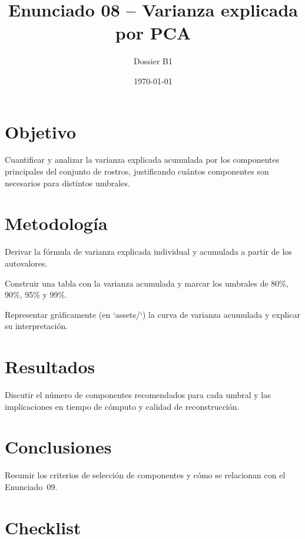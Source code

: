 \documentclass[12pt]{article}
\title{Enunciado 08 -- Varianza explicada por PCA}
\author{Dossier B1}
\date{\today}
\begin{document}
\maketitle
\section{Objetivo}
Cuantificar y analizar la varianza explicada acumulada por los componentes principales del conjunto de rostros, justificando cuántos componentes son necesarios para distintos umbrales.

\section{Metodología}
\begin{pasoapaso}
  \item Derivar la fórmula de varianza explicada individual y acumulada a partir de los autovalores.
  \item Construir una tabla con la varianza acumulada y marcar los umbrales de 80\%, 90\%, 95\% y 99\%.
  \item Representar gráficamente (en `assets/`) la curva de varianza acumulada y explicar su interpretación.
\end{pasoapaso}

\section{Resultados}
Discutir el número de componentes recomendados para cada umbral y las implicaciones en tiempo de cómputo y calidad de reconstrucción.

\section{Conclusiones}
Resumir los criterios de selección de componentes y cómo se relacionan con el Enunciado~09.

\section*{Checklist}
\ChecklistBase
\end{document}
